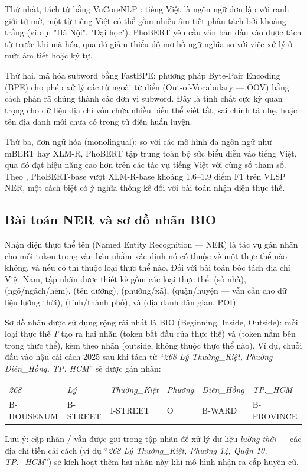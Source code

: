 Thứ nhất, tách từ bằng VnCoreNLP \cite{Vu2018VnCoreNLP}: tiếng Việt là ngôn ngữ đơn lập với ranh giới từ mờ, một từ tiếng Việt có thể gồm nhiều âm tiết phân tách bởi khoảng trắng (ví dụ: "Hà Nội", "Đại học"). PhoBERT yêu cầu văn bản đầu vào được tách từ trước khi mã hóa, qua đó giảm thiểu độ mơ hồ ngữ nghĩa so với việc xử lý ở mức âm tiết hoặc ký tự.

Thứ hai, mã hóa subword bằng FastBPE: phương pháp Byte-Pair Encoding (BPE) cho phép xử lý các từ ngoài từ điển (Out-of-Vocabulary --- OOV) bằng cách phân rã chúng thành các đơn vị subword. Đây là tính chất cực kỳ quan trọng cho dữ liệu địa chỉ vốn chứa nhiều biến thể viết tắt, sai chính tả nhẹ, hoặc tên địa danh mới chưa có trong từ điển huấn luyện.

Thứ ba, đơn ngữ hóa (monolingual): so với các mô hình đa ngôn ngữ như mBERT hay XLM-R, PhoBERT tập trung toàn bộ sức biểu diễn vào tiếng Việt, qua đó đạt hiệu năng cao hơn trên các tác vụ tiếng Việt với cùng số tham số. Theo \cite{nguyen2020phobert}, PhoBERT-base vượt XLM-R-base khoảng 1.6--1.9 điểm F1 trên VLSP NER, một cách biệt có ý nghĩa thống kê đối với bài toán nhận diện thực thể.

\subsection{Bài toán NER và sơ đồ nhãn BIO}

Nhận diện thực thể tên (Named Entity Recognition --- NER) là tác vụ gán nhãn cho mỗi token trong văn bản nhằm xác định nó có thuộc về một thực thể nào không, và nếu có thì thuộc loại thực thể nào. Đối với bài toán bóc tách địa chỉ Việt Nam, tập nhãn được thiết kế gồm các loại thực thể:  (số nhà),  (ngõ/ngách/hẻm),  (tên đường),  (phường/xã),  (quận/huyện --- vẫn cần cho dữ liệu lưỡng thời),  (tỉnh/thành phố), và  (địa danh dân gian, POI).

Sơ đồ nhãn được sử dụng rộng rãi nhất là BIO (Beginning, Inside, Outside): mỗi loại thực thể $T$ tạo ra hai nhãn  (token bắt đầu của thực thể) và  (token nằm bên trong thực thể), kèm theo nhãn  (outside, không thuộc thực thể nào). Ví dụ, chuỗi đầu vào hậu cải cách 2025 sau khi tách từ ``\textit{268 Lý Thường\_Kiệt, Phường Diên\_Hồng, TP. HCM}'' sẽ được gán nhãn:
\begin{center}
\small
\begin{tabular}{llllll}
\textit{268} & \textit{Lý} & \textit{Thường\_Kiệt} & \textit{Phường} & \textit{Diên\_Hồng} & \textit{TP.\_HCM} \\
B-HOUSENUM & B-STREET & I-STREET & O & B-WARD & B-PROVINCE
\end{tabular}
\end{center}
Lưu ý: cặp nhãn / vẫn được giữ trong tập nhãn để xử lý dữ liệu \emph{lưỡng thời} --- các địa chỉ tiền cải cách (ví dụ ``\textit{268 Lý Thường\_Kiệt, Phường 14, Quận 10, TP.\_HCM}'') sẽ kích hoạt thêm hai nhãn này khi mô hình nhận ra cấp huyện cũ.

